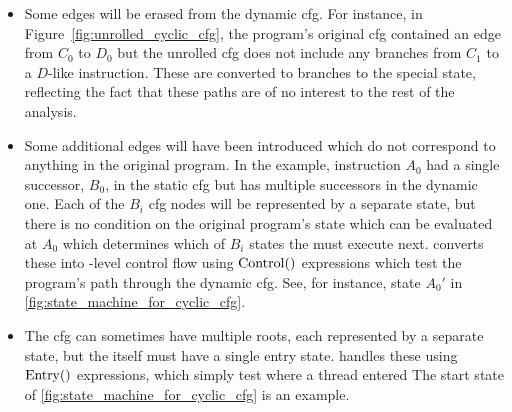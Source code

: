 \begin{itemize}
\item
  Some edges will be erased from the dynamic \gls{cfg}.  For instance,
  in Figure~\ref{fig:unrolled_cyclic_cfg}, the program's original
  \gls{cfg} contained an edge from $C_0$ to $D_0$ but the unrolled
  \gls{cfg} does not include any branches from $C_1$ to a $D$-like
  instruction.  These are converted to branches to the special
  {\stUnreached} state, reflecting the fact that these paths are of no
  interest to the rest of the analysis.

\item
  Some additional edges will have been introduced which do not
  correspond to anything in the original program.  In the example,
  instruction $A_0$ had a single successor, $B_0$, in the static
  \gls{cfg} but has multiple successors in the dynamic one.  Each of
  the $B_i$ \gls{cfg} nodes will be represented by a separate
  {\StateMachine} state, but there is no condition on the original
  program's state which can be evaluated at $A_0$ which determines
  which of $B_i$ states the {\StateMachine} must execute next.
  {\Technique} converts these into {\StateMachine}-level control flow
  using ${\mathrm{Control}}()$ expressions which test the program's
  path through the dynamic \gls{cfg}.  See, for instance, state $A_0'$
  in \autoref{fig:state_machine_for_cyclic_cfg}.

\item
  The \gls{cfg} can sometimes have multiple roots, each represented by
  a separate {\StateMachine} state, but the {\StateMachine} itself
  must have a single entry state.  {\Technique} handles these using
  $\mathrm{Entry}()$ expressions, which simply test where a thread entered
  The start state of \autoref{fig:state_machine_for_cyclic_cfg} is an
  example.

\end{itemize}
\begin{figure}
  \vspace{-20pt}
  \vspace{-12pt}
  \caption{}
  \label{fig:derive:example_dissassembly1}
  \vspace{-24pt}
\end{figure}
